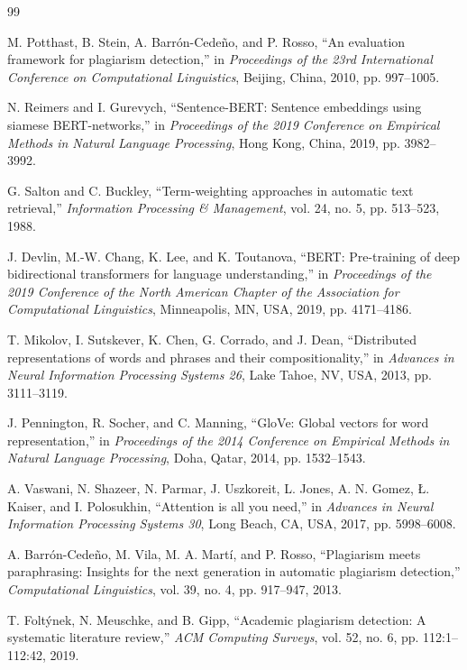 \documentclass{llncs}
\begin{document}
\begin{thebibliography}{99}

M. Potthast, B. Stein, A. Barrón-Cedeño, and P. Rosso, ``An evaluation framework for plagiarism detection,'' in \textit{Proceedings of the 23rd International Conference on Computational Linguistics}, Beijing, China, 2010, pp. 997--1005.

N. Reimers and I. Gurevych, ``Sentence-BERT: Sentence embeddings using siamese BERT-networks,'' in \textit{Proceedings of the 2019 Conference on Empirical Methods in Natural Language Processing}, Hong Kong, China, 2019, pp. 3982--3992.

G. Salton and C. Buckley, ``Term-weighting approaches in automatic text retrieval,'' \textit{Information Processing \& Management}, vol. 24, no. 5, pp. 513--523, 1988.

J. Devlin, M.-W. Chang, K. Lee, and K. Toutanova, ``BERT: Pre-training of deep bidirectional transformers for language understanding,'' in \textit{Proceedings of the 2019 Conference of the North American Chapter of the Association for Computational Linguistics}, Minneapolis, MN, USA, 2019, pp. 4171--4186.

T. Mikolov, I. Sutskever, K. Chen, G. Corrado, and J. Dean, ``Distributed representations of words and phrases and their compositionality,'' in \textit{Advances in Neural Information Processing Systems 26}, Lake Tahoe, NV, USA, 2013, pp. 3111--3119.

J. Pennington, R. Socher, and C. Manning, ``GloVe: Global vectors for word representation,'' in \textit{Proceedings of the 2014 Conference on Empirical Methods in Natural Language Processing}, Doha, Qatar, 2014, pp. 1532--1543.

A. Vaswani, N. Shazeer, N. Parmar, J. Uszkoreit, L. Jones, A. N. Gomez, Ł. Kaiser, and I. Polosukhin, ``Attention is all you need,'' in \textit{Advances in Neural Information Processing Systems 30}, Long Beach, CA, USA, 2017, pp. 5998--6008.

A. Barrón-Cedeño, M. Vila, M. A. Martí, and P. Rosso, ``Plagiarism meets paraphrasing: Insights for the next generation in automatic plagiarism detection,'' \textit{Computational Linguistics}, vol. 39, no. 4, pp. 917--947, 2013.

T. Foltýnek, N. Meuschke, and B. Gipp, ``Academic plagiarism detection: A systematic literature review,'' \textit{ACM Computing Surveys}, vol. 52, no. 6, pp. 112:1--112:42, 2019.


\end{thebibliography}
\end{document}
